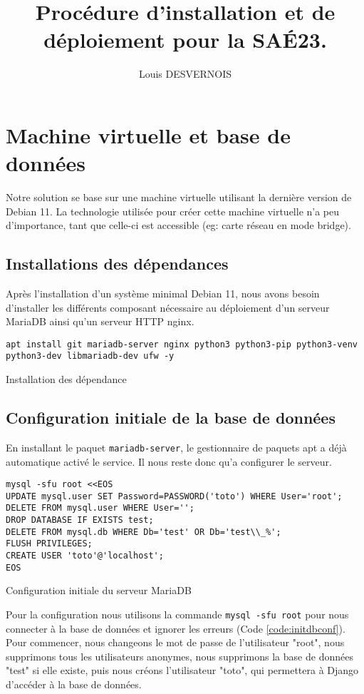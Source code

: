 \documentclass{article}
\author{Louis DESVERNOIS}
\title{Procédure d'installation et de déploiement pour la SAÉ23.}
\begin{document}
\maketitle
\tableofcontents
\listoffigures
\listoflistings
\newpage
\section{Machine virtuelle et base de données}
    Notre solution se base sur une machine virtuelle utilisant la dernière version de Debian 11. La technologie utilisée pour créer cette machine virtuelle n'a peu d'importance, tant que celle-ci est accessible (eg: carte réseau en mode bridge). 

        \subsection{Installations des dépendances}
        Après l'installation d'un système minimal Debian 11, nous avons besoin d'installer les différents composant nécessaire au déploiement d'un serveur MariaDB ainsi qu'un serveur HTTP nginx.
        \begin{listing}[H]
            \begin{verbatim}
apt install git mariadb-server nginx python3 python3-pip python3-venv python3-dev libmariadb-dev ufw -y
            \end{verbatim}
            \caption{Installation des dépendance}
            \label{code:deps-install}
        \end{listing}

        \subsection{Configuration initiale de la base de données}
        En installant le paquet \verb|mariadb-server|, le gestionnaire de paquets apt a déjà automatique activé le service. Il nous reste donc qu'a configurer le serveur.
        \begin{listing}[H]
            \begin{verbatim}
mysql -sfu root <<EOS
UPDATE mysql.user SET Password=PASSWORD('toto') WHERE User='root';
DELETE FROM mysql.user WHERE User='';
DROP DATABASE IF EXISTS test;
DELETE FROM mysql.db WHERE Db='test' OR Db='test\\_%';
FLUSH PRIVILEGES;
CREATE USER 'toto'@'localhost';
EOS
            \end{verbatim}
            \caption{Configuration initiale du serveur MariaDB}
            \label{code:initdbconf}
        \end{listing}
        Pour la configuration nous utilisons la commande \verb|mysql -sfu root| pour nous connecter à la base de données et ignorer les erreurs (Code \ref{code:initdbconf}). Pour commencer, nous changeons le mot de passe de l'utilisateur "root", nous supprimons tous les utilisateurs anonymes, nous supprimons la base de données "test" si elle existe, puis nous créons l'utilisateur "toto", qui permettera à Django d'accéder à la base de données.
\end{document}
